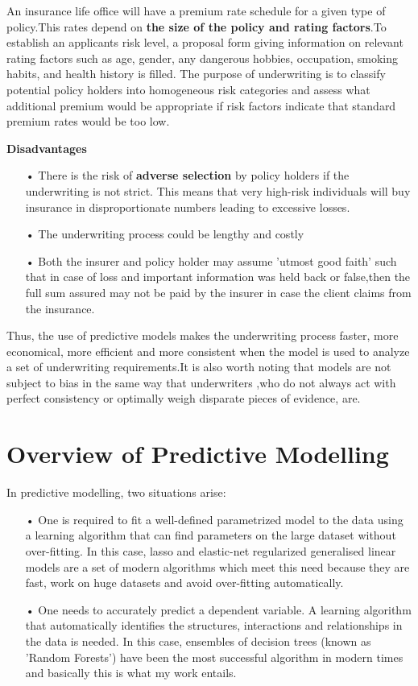 \citep{dickson2013actuarial} An insurance life office will have a premium rate schedule for a given type of policy.This rates depend on \textbf{the size of the policy and rating factors}.To establish an applicants risk level, a proposal form giving information on relevant rating factors such as age, gender,  any dangerous hobbies, occupation, smoking habits, and health history is filled. The purpose of underwriting is to classify potential policy holders into homogeneous risk categories and assess what additional premium would be appropriate if risk factors indicate that standard premium rates would be too low.


\textbf{Disadvantages}
\begin{enumerate}
\item[•] There is the risk of \textbf{adverse selection} by policy holders if the underwriting is not strict. This means that very high-risk individuals will buy insurance in disproportionate numbers leading to excessive losses.

\item[•] The underwriting process could be lengthy and costly

\item[•] Both the insurer and policy holder may assume 'utmost good faith' such that in case of loss and important information was held back or false,then the full sum assured may not be paid by the insurer in case the client claims from the insurance.
\end{enumerate}

Thus, the use of predictive models makes the underwriting process faster, more economical, more efficient and more consistent when the model is used to analyze a set of underwriting requirements.It is also worth noting that models are not subject to bias in the same way that underwriters ,who do not always act with perfect consistency or optimally weigh disparate pieces of evidence, are.

\section{Overview of Predictive Modelling}

In predictive modelling, two situations arise:

\begin{enumerate}
\item[•] One is required to fit a well-defined parametrized model to the data using a learning algorithm that can find parameters on the large dataset without over-fitting. In this case, lasso and elastic-net regularized generalised linear models are a set of modern algorithms which meet this need because they are fast, work on huge datasets and avoid over-fitting automatically.

\item[•] One needs to accurately predict a dependent variable. A learning algorithm that automatically identifies the structures, interactions and relationships in the data is needed. In this case, ensembles of decision trees (known as 'Random Forests') have been the most successful algorithm in modern times and basically this is what my work entails.
\end{enumerate}

